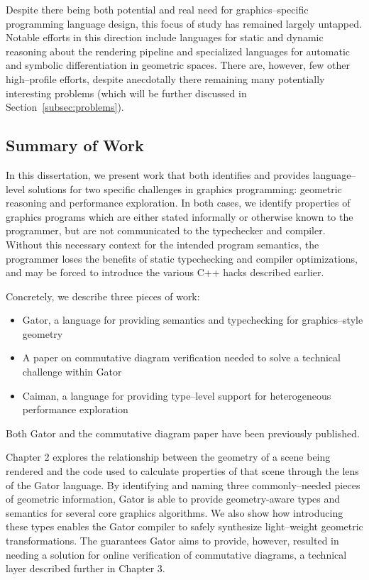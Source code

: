 Despite there being both potential and real need for graphics--specific programming language design, this focus of study has remained largely untapped.  Notable efforts in this direction include languages for static and dynamic reasoning about the rendering pipeline and specialized languages for automatic and symbolic differentiation in geometric spaces.  There are, however, few other high--profile efforts, despite anecdotally there remaining many potentially interesting problems (which will be further discussed in Section~\ref{subsec:problems}).

\subsection{Summary of Work}

In this dissertation, we present work that both identifies and provides language--level solutions for two specific challenges in graphics programming: geometric reasoning and performance exploration.  In both cases, we identify properties of graphics programs which are either stated informally or otherwise known to the programmer, but are not communicated to the typechecker and compiler.  Without this necessary context for the intended program semantics, the programmer loses the benefits of static typechecking and compiler optimizations, and may be forced to introduce the various C++ hacks described earlier.

Concretely, we describe three pieces of work:
%
\begin{itemize}
\item Gator, a language for providing semantics and typechecking for graphics--style geometry
\item A paper on commutative diagram verification needed to solve a technical challenge within Gator
\item Caiman, a language for providing type--level support for heterogeneous performance exploration
\end{itemize}
%
Both Gator and the commutative diagram paper have been previously published.

Chapter 2 explores the relationship between the geometry of a scene being rendered and the code used to calculate properties of that scene through the lens of the Gator language.  By identifying and naming three commonly--needed pieces of geometric information, Gator is able to provide geometry-aware types and semantics for several core graphics algorithms.  We also show how introducing these types enables the Gator compiler to safely synthesize light--weight geometric transformations.  The guarantees Gator aims to provide, however, resulted in needing a solution for online verification of commutative diagrams, a technical layer described further in Chapter 3.

